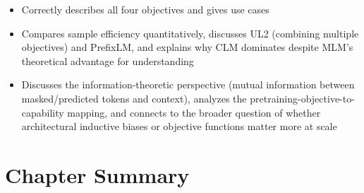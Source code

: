 \begin{interviewq}
\goodgreat
\begin{itemize}
    \item {} Correctly describes all four objectives and gives use cases
    \item {} Compares sample efficiency quantitatively, discusses UL2
          (combining multiple objectives) and PrefixLM, and explains why CLM dominates
          despite MLM's theoretical advantage for understanding
    \item {} Discusses the information-theoretic perspective (mutual
          information between masked/predicted tokens and context), analyzes the
          pretraining-objective-to-capability mapping, and connects to the broader
          question of whether architectural inductive biases or objective functions
          matter more at scale
\end{itemize}

\end{interviewq}


\section*{Chapter Summary}

